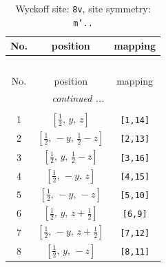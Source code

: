 \documentclass[fleqn,8pt]{jsarticle}
\begin{document}
\begin{longtable}{ccc}
\caption{Wyckoff site: {\tt 8v}, site symmetry: {\tt m'..}}
 \\
 \hline \hline
No. & position & mapping \\ \hline \endfirsthead

\multicolumn{2}{l}{\tablename\ \thetable{}} \\
 \hline \hline
No. & position & mapping \\ \hline \endhead

 \hline \hline
\multicolumn{2}{r}{\footnotesize\it continued ...} \\ \endfoot

 \hline \hline
\multicolumn{2}{r}{} \\ \endlastfoot

1 & $\left[ \frac{1}{2},\, y,\, z \right]$ & {\tt [1,14]} \\ \hline
2 & $\left[ \frac{1}{2},\, - y,\, \frac{1}{2} - z \right]$ & {\tt [2,13]} \\ \hline
3 & $\left[ \frac{1}{2},\, y,\, \frac{1}{2} - z \right]$ & {\tt [3,16]} \\ \hline
4 & $\left[ \frac{1}{2},\, - y,\, z \right]$ & {\tt [4,15]} \\ \hline
5 & $\left[ \frac{1}{2},\, - y,\, - z \right]$ & {\tt [5,10]} \\ \hline
6 & $\left[ \frac{1}{2},\, y,\, z + \frac{1}{2} \right]$ & {\tt [6,9]} \\ \hline
7 & $\left[ \frac{1}{2},\, - y,\, z + \frac{1}{2} \right]$ & {\tt [7,12]} \\ \hline
8 & $\left[ \frac{1}{2},\, y,\, - z \right]$ & {\tt [8,11]} \\
\end{longtable}
\renewcommand{\arraystretch}{1.2}
\end{document}
